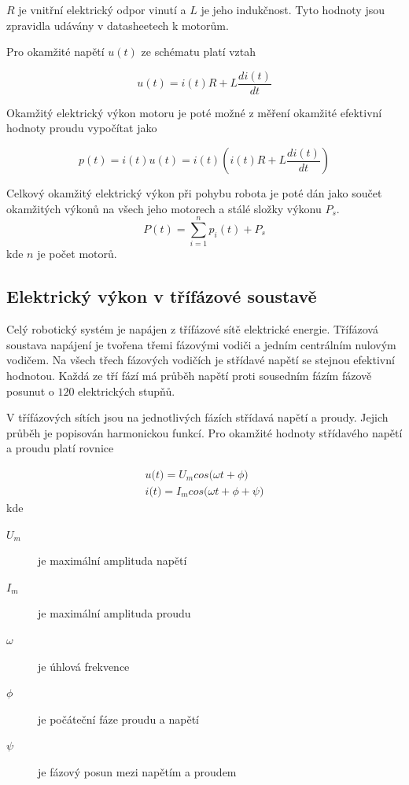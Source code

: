 $R$ je vnitřní elektrický odpor vinutí a $L$ je jeho indukčnost. Tyto hodnoty jsou zpravidla udávány v datasheetech k motorům.

Pro okamžité napětí $u(t)$ ze schématu platí vztah

\begin{equation}
u(t) = i(t)R + L\frac{di(t)}{dt}
\label{motor_voltage_eq}
\end{equation}  

Okamžitý elektrický výkon motoru je poté možné z měření okamžité efektivní hodnoty proudu vypočítat jako
 
\begin{equation}
p(t) = i(t)u(t) = i(t)\left(i(t)R + L\frac{di(t)}{dt}\right)
\label{motor_power_eq}
\end{equation} 

Celkový okamžitý elektrický výkon při pohybu robota je poté dán jako součet okamžitých výkonů na všech jeho motorech a stálé složky výkonu $P_s$.
\begin{equation}
P(t) = \sum_{i=1}^{n} p_i(t) + P_s
\label{robot_motor_power_eq}
\end{equation} 
kde $n$ je počet motorů.

\subsection{Elektrický výkon v třífázové soustavě}

Celý robotický systém je napájen z třífázové sítě elektrické energie. Třífázová soustava napájení je tvořena třemi fázovými vodiči a jedním centrálním nulovým vodičem. Na všech třech fázových vodičích je střídavé napětí se stejnou efektivní hodnotou. Každá ze tří fází má průběh napětí proti sousedním fázím fázově posunut o $120$ elektrických stupňů. 

V třífázových sítích jsou na jednotlivých fázích střídavá napětí a proudy. Jejich průběh je popisován harmonickou funkcí. Pro okamžité hodnoty střídavého napětí a proudu platí rovnice

\begin{equation}
\begin{split}
u\big(t\big) = U_m cos\big(\omega t + \phi\big) \\
i\big(t\big) = I_m cos\big(\omega t + \phi + \psi\big)
\end{split}
\label{harm_curr_volt_eq}
\end{equation}  
kde
\begin{description}
\item[$U_m$] je maximální amplituda napětí
\item[$I_m$] je maximální amplituda proudu
\item[$\omega$] je úhlová frekvence
\item[$\phi$] je počáteční fáze proudu a napětí
\item[$\psi$] je fázový posun mezi napětím a proudem
\end{description}

